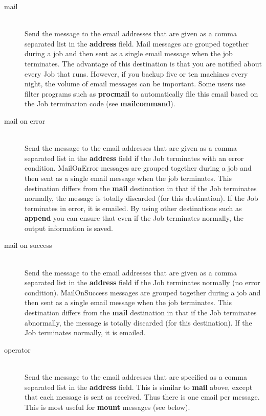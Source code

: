 \begin{description}
\begin{description}
\item [mail] \hfill \\
Send the message to the email addresses that are given as a comma
separated list in the {\bf address} field.  Mail messages are grouped
together during a job and then sent as a single email message when the
job terminates.  The advantage of this destination is that you are
notified about every Job that runs.  However, if you backup five or ten
machines every night, the volume of email messages can be important.
Some users use filter programs such as {\bf procmail} to automatically
file this email based on the Job termination code (see {\bf
mailcommand}).

\item [mail on error] \hfill \\
Send the message to the email addresses that are given as a comma
separated list in the {\bf address} field if the Job terminates with an
error condition.  MailOnError messages are grouped together during a job
and then sent as a single email message when the job terminates.  This
destination differs from the {\bf mail} destination in that if the Job
terminates normally, the message is totally discarded (for this
destination).  If the Job terminates in error, it is emailed.  By using
other destinations such as {\bf append} you can ensure that even if the
Job terminates normally, the output information is saved.

\item [mail on success] \hfill \\
Send the message to the email addresses that are given as a comma
separated list in the {\bf address} field if the Job terminates
normally (no error condition).  MailOnSuccess messages are grouped
together during a job and then sent as a single email message when the
job terminates.  This destination differs from the {\bf mail}
destination in that if the Job terminates abnormally, the message is
totally discarded (for this destination).  If the Job terminates
normally, it is emailed.

\item [operator] \hfill \\
Send the message to the email addresses that are specified as a comma
separated list in the {\bf address} field.  This is similar to {\bf
mail} above, except that each message is sent as received.  Thus there
is one email per message.  This is most useful for {\bf mount} messages
(see below).


\end{description}
\end{description}
